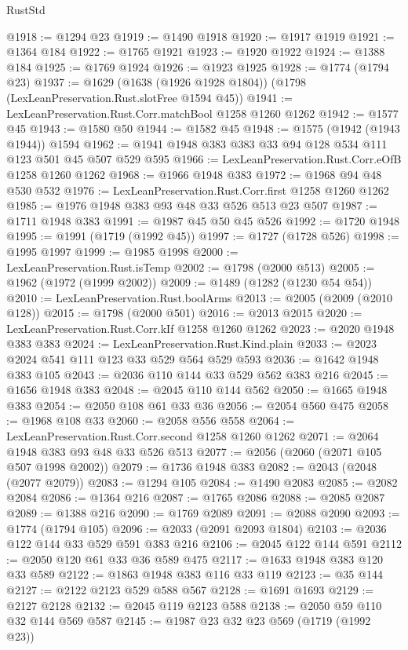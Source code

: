 \begin{lexlean}{RustStd}
\begin{coremodule}
{\begin{coremodule}
{{{{{{{{{{{{@1918 := @1294 @23
@1919 := @1490 @1918
@1920 := @1917 @1919
@1921 := @1364 @184
@1922 := @1765 @1921
@1923 := @1920 @1922
@1924 := @1388 @184
@1925 := @1769 @1924
@1926 := @1923 @1925
@1928 := @1774 (@1794 @23)
@1937 := @1629 (@1638 (@1926 @1928 @1804)) (@1798 (LexLeanPreservation.Rust.slotFree @1594 @45))
@1941 := LexLeanPreservation.Rust.Corr.matchBool @1258 @1260 @1262
@1942 := @1577 @45
@1943 := @1580 @50
@1944 := @1582 @45
@1948 := @1575 (@1942 (@1943 @1944)) @1594
@1962 := @1941 @1948 @383 @383 @33 @94 @128 @534 @111 @123 @501 @45 @507 @529 @595
@1966 := LexLeanPreservation.Rust.Corr.eOfB @1258 @1260 @1262
@1968 := @1966 @1948 @383
@1972 := @1968 @94 @48 @530 @532
@1976 := LexLeanPreservation.Rust.Corr.first @1258 @1260 @1262
@1985 := @1976 @1948 @383 @93 @48 @33 @526 @513 @23 @507
@1987 := @1711 @1948 @383
@1991 := @1987 @45 @50 @45 @526
@1992 := @1720 @1948
@1995 := @1991 (@1719 (@1992 @45))
@1997 := @1727 (@1728 @526)
@1998 := @1995 @1997
@1999 := @1985 @1998
@2000 := LexLeanPreservation.Rust.isTemp
@2002 := @1798 (@2000 @513)
@2005 := @1962 (@1972 (@1999 @2002))
@2009 := @1489 (@1282 (@1230 @54 @54))
@2010 := LexLeanPreservation.Rust.boolArms
@2013 := @2005 (@2009 (@2010 @128))
@2015 := @1798 (@2000 @501)
@2016 := @2013 @2015
@2020 := LexLeanPreservation.Rust.Corr.kIf @1258 @1260 @1262
@2023 := @2020 @1948 @383 @383
@2024 := LexLeanPreservation.Rust.Kind.plain
@2033 := @2023 @2024 @541 @111 @123 @33 @529 @564 @529 @593
@2036 := @1642 @1948 @383 @105
@2043 := @2036 @110 @144 @33 @529 @562 @383 @216
@2045 := @1656 @1948 @383
@2048 := @2045 @110 @144 @562
@2050 := @1665 @1948 @383
@2054 := @2050 @108 @61 @33 @36
@2056 := @2054 @560 @475
@2058 := @1968 @108 @33
@2060 := @2058 @556 @558
@2064 := LexLeanPreservation.Rust.Corr.second @1258 @1260 @1262
@2071 := @2064 @1948 @383 @93 @48 @33 @526 @513
@2077 := @2056 (@2060 (@2071 @105 @507 @1998 @2002))
@2079 := @1736 @1948 @383
@2082 := @2043 (@2048 (@2077 @2079))
@2083 := @1294 @105
@2084 := @1490 @2083
@2085 := @2082 @2084
@2086 := @1364 @216
@2087 := @1765 @2086
@2088 := @2085 @2087
@2089 := @1388 @216
@2090 := @1769 @2089
@2091 := @2088 @2090
@2093 := @1774 (@1794 @105)
@2096 := @2033 (@2091 @2093 @1804)
@2103 := @2036 @122 @144 @33 @529 @591 @383 @216
@2106 := @2045 @122 @144 @591
@2112 := @2050 @120 @61 @33 @36 @589 @475
@2117 := @1633 @1948 @383 @120 @33 @589
@2122 := @1863 @1948 @383 @116 @33 @119
@2123 := @35 @144
@2127 := @2122 @2123 @529 @588 @567
@2128 := @1691 @1693
@2129 := @2127 @2128
@2132 := @2045 @119 @2123 @588
@2138 := @2050 @59 @110 @32 @144 @569 @587
@2145 := @1987 @23 @32 @23 @569 (@1719 (@1992 @23))
}}}}}}}}}}}}
\end{coremodule}}
\end{coremodule}
\end{lexlean}

